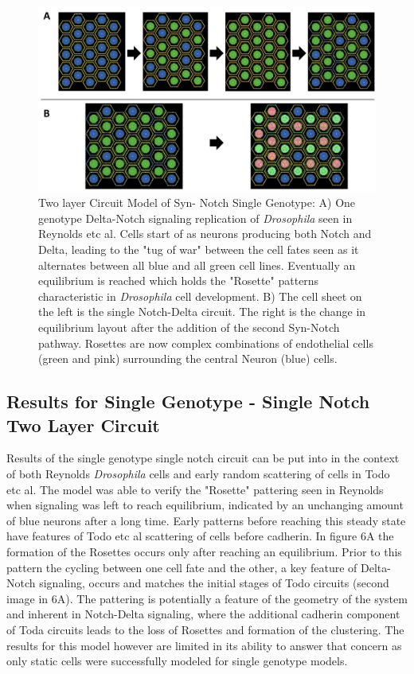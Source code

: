 \documentclass[12pt]{ifacconf}
\begin{document}
\begin{figure}
\begin{center}
\includegraphics[width=\textwidth]{One_Genotype_two_and_one_SynNotch} %
\caption{Two layer Circuit Model of Syn- Notch Single Genotype: A) One genotype Delta-Notch signaling replication of \emph{Drosophila} seen in Reynolds etc al. Cells start of as neurons producing both Notch and Delta, leading to the "tug of war" between the cell fates seen as it alternates between all blue and all green cell lines. Eventually an equilibrium is reached which holds the "Rosette" patterns characteristic in \emph{Drosophila} cell development. B) The cell sheet on the left is the single Notch-Delta circuit. The right is the change in equilibrium layout after the addition of the second Syn-Notch pathway. Rosettes are now complex combinations of endothelial cells (green and pink) surrounding the central Neuron (blue) cells. } 
\label{fig:bifurcation}
\end{center}
\end{figure}

\subsection{Results for Single Genotype - Single Notch Two Layer Circuit} 

Results of the single genotype single notch circuit can be put into in the context of both Reynolds \emph{Drosophila} cells and early random scattering of cells in Todo etc al. The model was able to verify the "Rosette" pattering seen in Reynolds when signaling was left to reach equilibrium, indicated by an unchanging amount of blue neurons after a long time. Early patterns before reaching this steady state have features of Todo etc al scattering of cells before cadherin. In figure 6A the formation of the Rosettes occurs only after reaching an equilibrium. Prior to this pattern the cycling between one cell fate and the other, a key feature of Delta-Notch signaling, occurs and matches the initial stages of Todo circuits (second image in 6A). The pattering is potentially a feature of the geometry of the system and inherent in Notch-Delta signaling, where the additional cadherin component of Toda circuits leads to the loss of Rosettes and formation of the clustering. The results for this model however are limited in its ability to answer that concern as only static cells were successfully modeled for single genotype models.
\end{document}
